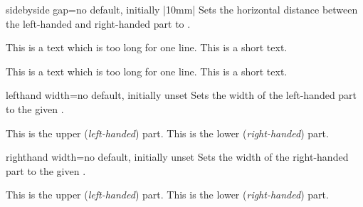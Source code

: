 \clearpage
\begin{docTcbKey}{sidebyside gap}{=}{no default, initially |10mm|}
Sets the horizontal distance between the left-handed and right-handed part to
.
\begin{dispExample}

\begin{tcolorbox}[adjusted title=Wide gap,sidebyside gap=30mm]
This is a text which is too long for one line.
\tcblower
This is a short text.
\end{tcolorbox}\hfill
\begin{tcolorbox}[adjusted title=Narrow gap,sidebyside gap=1mm]
This is a text which is too long for one line.
\tcblower
This is a short text.
\end{tcolorbox}
\end{dispExample}
\end{docTcbKey}


\begin{docTcbKey}{lefthand width}{=}{no default, initially unset}
Sets the width of the left-handed part to the given .
\begin{dispExample}

\begin{tcolorbox}[title=My title,sidebyside,lefthand width=3cm]
This is the upper (\textit{left-handed}) part.
\tcblower
This is the lower (\textit{right-handed}) part.
\end{tcolorbox}
\end{dispExample}
\end{docTcbKey}

\enlargethispage*{1cm}
\begin{docTcbKey}{righthand width}{=}{no default, initially unset}
Sets the width of the right-handed part to the given .
\begin{dispExample}

\begin{tcolorbox}[title=My title,sidebyside,righthand width=3cm]
This is the upper (\textit{left-handed}) part.
\tcblower
This is the lower (\textit{right-handed}) part.
\end{tcolorbox}
\end{dispExample}
\end{docTcbKey}

